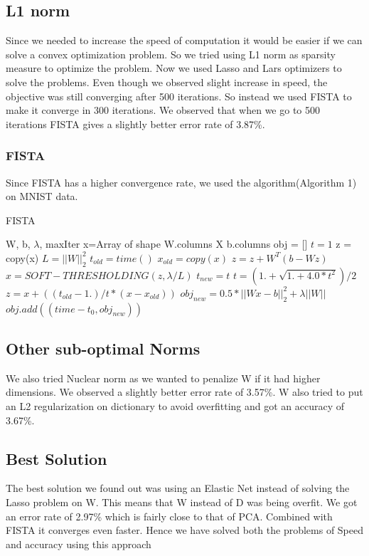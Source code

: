 \documentclass{article}
\begin{document}
\subsection{L1 norm}
Since we needed to increase the speed of computation it would be easier if we can solve a convex optimization problem. So we tried using L1 norm as sparsity measure to optimize the problem. Now we used Lasso and Lars optimizers to solve the problems. Even though we observed slight increase in speed, the objective was still converging after 500 iterations. So instead we used FISTA\cite{beck2009fast} to make it converge in 300 iterations. We observed that when we go to 500 iterations FISTA gives a slightly better error rate of 3.87\%.
 
\subsubsection{FISTA}
Since FISTA has a higher convergence rate, we used the algorithm(Algorithm 1) on MNIST data. 
\begin{algorithm}[ht]
   \caption{FISTA}
   \label{alg:example}
\begin{algorithmic}
    W, b, $\lambda$, maxIter
   \STATE x=Array of shape W.columns X b.columns
   \STATE obj = []
   \STATE $t=1$
   \STATE z = copy(x)
   \STATE $L = ||W||_{2}^{2}$
   \STATE $t_{old} = time()$
      \STATE $x_{old} = copy(x)$
      \STATE $z = z + W^{T}(b-Wz)$
      \STATE $x = SOFT-THRESHOLDING(z, \lambda/L)$
      \STATE $t_{new} = t$
      \STATE $t = (1. + \sqrt{1. + 4.0*t^{2}})/2$
      \STATE $z = x + ((t_{old}-1.)/t * (x-x_{old}))$
      \STATE $obj_{new} = 0.5 * ||Wx-b||_{2}^{2} + \lambda ||W||$
      \STATE $obj.add((time - t_{0}, obj_{new}))$
   \ENDFOR
   \end{algorithmic}
\end{algorithm}


\subsection{Other sub-optimal Norms}
We also tried Nuclear norm as we wanted to penalize W if it had higher dimensions. We observed a slightly better error rate of 3.57\%. W also tried to put an L2 regularization on dictionary to avoid overfitting and got an accuracy of 3.67\%.

\subsection{Best Solution}
The best solution we found out was using an Elastic Net\cite{zhou2011manifold} instead of solving the Lasso problem on W. This means that W instead of D was being overfit. We got an error rate of 2.97\% which is fairly close to that of PCA. Combined with FISTA it converges even faster. Hence we have solved both the problems of Speed and accuracy using this approach
\end{document}
